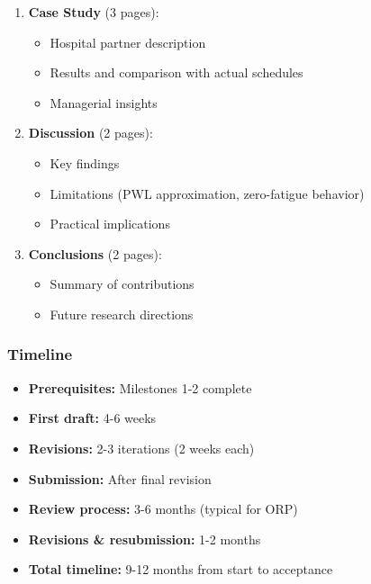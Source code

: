 \documentclass[11pt,letterpaper]{article}
\begin{document}
\begin{enumerate}[leftmargin=*]
\begin{itemize}[leftmargin=*]
        \item Test instances (small, medium, large)
        \item Parameter tuning results (Milestone 1)
        \item Statistical validation (Milestone 2)
        \item Sensitivity analysis
        \item Computational performance
    \end{itemize}
    \item \textbf{Case Study} (3 pages):
    \begin{itemize}[leftmargin=*]
        \item Hospital partner description
        \item Results and comparison with actual schedules
        \item Managerial insights
    \end{itemize}
    \item \textbf{Discussion} (2 pages):
    \begin{itemize}[leftmargin=*]
        \item Key findings
        \item Limitations (PWL approximation, zero-fatigue behavior)
        \item Practical implications
    \end{itemize}
    \item \textbf{Conclusions} (2 pages):
    \begin{itemize}[leftmargin=*]
        \item Summary of contributions
        \item Future research directions
    \end{itemize}
\end{enumerate}

\subsubsection{Timeline}
\begin{itemize}[leftmargin=*]
    \item \textbf{Prerequisites:} Milestones 1-2 complete
    \item \textbf{First draft:} 4-6 weeks
    \item \textbf{Revisions:} 2-3 iterations (2 weeks each)
    \item \textbf{Submission:} After final revision
    \item \textbf{Review process:} 3-6 months (typical for ORP)
    \item \textbf{Revisions \& resubmission:} 1-2 months
    \item \textbf{Total timeline:} 9-12 months from start to acceptance
\end{itemize}
\end{document}
